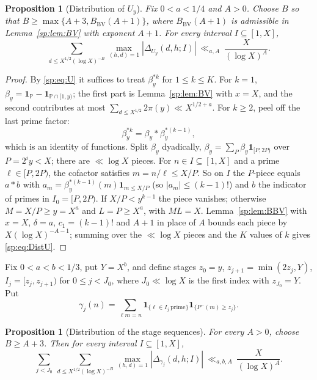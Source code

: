 \documentclass[final,11pt]{elsarticle}
\newtheorem{proposition}[theorem]{Proposition}
\theoremstyle{definition}
\theoremstyle{remark}
\newcommand{\PP}{\mathbb{P}}
\newcommand{\one}{\mathbf1}
\numberwithin{equation}{section}
\begin{document}
\begin{proposition}[Distribution of $U_y$]\label{sp:prop:distU}
Fix $0<a<1/4$ and $A>0$. Choose $B$ so that
$B\ge\max\{A+3,B_{\mathrm{BV}}(A+1)\}$, where
$B_{\mathrm{BV}}(A+1)$ is admissible in Lemma~\ref{sp:lem:BV}
with exponent $A+1$. For every interval $I\subseteq[1,X]$,
\begin{equation}\label{sp:eq:DistU}
 \sum_{d\le X^{1/2}(\log X)^{-B}}\max_{(h,d)=1}|\Delta_{U_y}(d,h;I)|\ \ll_{a,A}\ \frac{X}{(\log X)^A}.
\end{equation}
\end{proposition}

\begin{proof}
By \eqref{sp:eq:U} it suffices to treat $\beta_y^{*k}$ for $1\le k\le K$. For $k=1$,
$\beta_y=\one_\PP-\one_{\PP\cap[1,y)}$; the first part is Lemma~\ref{sp:lem:BV}
with $x=X$, and the second contributes at most
$\sum_{d\le X^{1/2}}2\pi(y)\ll X^{1/2+a}$. For $k\ge2$, peel off the last prime
factor:
\[
 \beta_y^{*k}=\beta_y*\beta_y^{*(k-1)},
\]
which is an identity of functions. Split $\beta_y$ dyadically,
$\beta_y=\sum_{P}\beta_y\one_{[P,2P)}$ over $P=2^iy<X$; there are $\ll\log X$
pieces. For $n\in I\subseteq[1,X]$ and a prime $\ell\in[P,2P)$, the cofactor
satisfies $m=n/\ell\le X/P$. So on $I$ the $P$-piece equals $a*b$ with
$a_m=\beta_y^{*(k-1)}(m)\one_{m\le X/P}$ (so $|a_m|\le(k-1)!$) and $b$ the
indicator of primes in $I_0=[P,2P)$. If $X/P<y^{k-1}$ the piece vanishes;
otherwise $M=X/P\ge y=X^a$ and $L=P\ge X^a$, with $ML=X$. Lemma~\ref{sp:lem:BBV}
with $x=X$, $\delta=a$, $c_1=(k-1)!$ and $A+1$ in place of $A$ bounds each
piece by $X(\log X)^{-A-1}$; summing over the $\ll\log X$ pieces and the $K$
values of $k$ gives \eqref{sp:eq:DistU}.
\end{proof}

Fix $0<a<b<1/3$, put $Y=X^b$, and define stages
$z_0=y$, $z_{j+1}=\min(2z_j,Y)$, $I_j=[z_j,z_{j+1})$ for $0\le j<J_0$, where
$J_0\ll\log X$ is the first index with $z_{J_0}=Y$. Put
\begin{equation}\label{sp:eq:gamma}
 \gamma_j(n)=\sum_{\ell m=n}\one_{\{\ell\in I_j\ \mathrm{prime}\}}\one_{\{P^-(m)\ge z_j\}}.
\end{equation}

\begin{proposition}[Distribution of the stage sequences]\label{sp:prop:distG}
For every $A>0$, choose $B\ge A+3$. Then for every interval
$I\subseteq[1,X]$,
\begin{equation}\label{sp:eq:DistG}
 \sum_{j<J_0}\ \sum_{d\le X^{1/2}(\log X)^{-B}}\max_{(h,d)=1}|\Delta_{\gamma_j}(d,h;I)|
 \ \ll_{a,b,A}\ \frac{X}{(\log X)^A}.
\end{equation}
\end{proposition}
\end{document}
